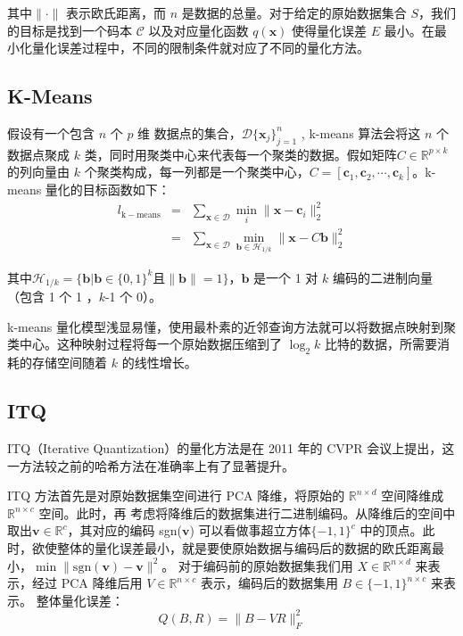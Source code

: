 其中$\lVert \cdot \rVert$ 表示欧氏距离，而 $n$ 是数据的总量。对于给定的原始数据集合 $S$，我们的目标是找到一个码本 $\mathcal{C}$ 以及对应量化函数 $q(\mathbf{x})$ 使得量化误差 $E$ 最小。在最小化量化误差过程中，不同的限制条件就对应了不同的量化方法。
\subsection{K-Means}
假设有一个包含 $n$ 个 $p$ 维 数据点的集合，$\mathcal{D}\{\mathbf{x}_j\}_{j=1}^n$ , k-means 算法会将这 $n$ 个数据点聚成 $k$ 类，同时用聚类中心来代表每一个聚类的数据。假如矩阵$C \in \mathbb{R}^{p\times k}$的列向量由 $k$ 个聚类构成，每一列都是一个聚类中心，$C=[\mathbf{c}_1,\mathbf{c}_2,\cdots, \mathbf{c}_k]$。k-means 量化的目标函数如下：
\begin{eqnarray}
\mathit{l}_\mathrm{k-means} &=&\sum_{\mathbf{x}\in\mathcal{D}}\min_{i}\lVert \mathbf{x} - \mathbf{c}_i \rVert _2^2 \\
                   &=&\sum_{\mathbf{x}\in\mathcal{D}}\min_{\mathbf{b}\in\mathcal{H}_{1/k}}\lVert \mathbf{x} - C\mathbf{b} \rVert _2^2
\end{eqnarray}

其中$\mathcal{H}_{1/k} = \{\mathbf{b}|\mathbf{b}\in\{0,1\}^k$且$\lVert\mathbf{b}\rVert=1\}$，$\mathbf{b}$ 是一个 1 对 $k$ 编码的二进制向量（包含 1 个 1 ，$k$-1 个 0）。

k-means 量化模型浅显易懂，使用最朴素的近邻查询方法就可以将数据点映射到聚类中心。这种映射过程将每一个原始数据压缩到了 $\log_2k$ 比特的数据，所需要消耗的存储空间随着 $k$ 的线性增长。
\subsection{ITQ}
ITQ（Iterative Quantization）\cite{YunchaoGong:2011:IQP:2191740.2191779}的量化方法是在 2011 年的 CVPR 会议上提出，这一方法较之前的哈希方法在准确率上有了显著提升。

ITQ 方法首先是对原始数据集空间进行 PCA 降维，将原始的 $\mathbb{R}^{n\times d}$ 空间降维成 $\mathbb{R}^{n\times c}$ 空间。此时，再
考虑将降维后的数据集进行二进制编码。从降维后的空间中取出$\mathbf{v}\in \mathbb{R}^{c}$，其对应的编码 sgn($\mathbf{v}$) 可以看做事超立方体$\{-1,1\}^c$
中的顶点。此时，欲使整体的量化误差最小，就是要使原始数据与编码后的数据的欧氏距离最小，$\min{\lVert \mathrm{sgn}(\mathbf{v})-\mathbf{v}\rVert ^2}$。
对于编码前的原始数据集我们用 $X \in \mathbb{R}^{n\times d}$ 来表示，经过 PCA 降维后用 $V \in \mathbb{R}^{n\times c}$ 表示，编码后的数据集用 $B \in \{-1,1\}^{n\times c}$ 来表示。
整体量化误差：
\begin{equation}
Q(B, R) = \lVert B - VR \rVert_F ^2
\end{equation}

